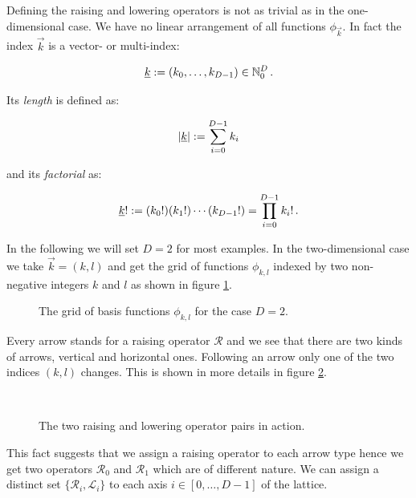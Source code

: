 Defining the raising and lowering operators is not as trivial as in the
one-dimensional case. We have no linear arrangement of all functions $\phi_{\vec{k}}$.
In fact the index $\vec{k}$ is a vector- or multi-index:

\begin{equation}
  \underline{k} := ( k_0, \ldots, k_{D-1} ) \in \mathbb{N}_0^D \,.
\end{equation}

Its \emph{length} is defined as:

\begin{equation}
  |\underline{k}| := \sum_{i=0}^{D-1} k_i
\end{equation}

and its \emph{factorial} as:

\begin{equation}
  \underline{k}! := (k_0!)(k_1!)\cdots(k_{D-1}!) = \prod_{i=0}^{D-1} k_i! \,.
\end{equation}

In the following we will set $D=2$ for most examples. In the two-dimensional case
we take $\vec{k} = (k,l)$ and get the grid of functions $\phi_{k,l}$ indexed by
two non-negative integers $k$ and $l$ as shown in figure \ref{fig:phi_kl_grid}.

\begin{figure}
  \centering
  
  \caption{The grid of basis functions $\phi_{k,l}$ for the case $D=2$.}
  \label{fig:phi_kl_grid}
\end{figure}

Every arrow stands for a raising operator $\mathcal{R}$ and we see that there are
two kinds of arrows, vertical and horizontal ones. Following an arrow only one
of the two indices $(k,l)$ changes. This is shown in more details in figure
\ref{fig:phi_kl_operators}.

\begin{figure}[h!]
  \centering
  \subfloat[][]{
    
  }
  \subfloat[][]{
    
  } \\
    \caption[]{The two raising and lowering operator pairs in action.}
    \label{fig:phi_kl_operators}
\end{figure}

This fact suggests that we assign a raising operator to each arrow type hence we
get two operators $\mathcal{R}_0$ and $\mathcal{R}_1$ which are of different
nature. We can assign a distinct set $\{\mathcal{R}_i, \mathcal{L}_i\}$ to each
axis $i \in [0, \ldots, D-1]$ of the lattice.


